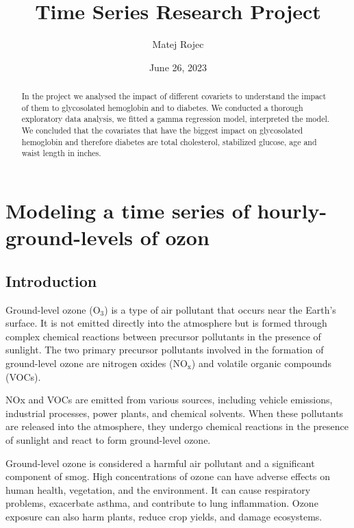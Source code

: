 \documentclass{article}
\title{Time Series Research Project}
\author{Matej Rojec}
\date{June 26, 2023}
\begin{document}
\maketitle
\newpage

\tableofcontents
\listoffigures
\listoftables

\newpage

\begin{abstract}
    In the project we analysed the impact of different covariets to understand the impact of them to glycosolated hemoglobin and to diabetes. We conducted a thorough exploratory data analysis, we fitted a gamma regression model, interpreted the model. We concluded that the covariates that have the biggest impact on glycosolated hemoglobin and therefore diabetes are total cholesterol, stabilized glucose, age and waist length in inches.
\end{abstract}

\section{Modeling a time series of hourly-ground-levels of ozon}

\subsection{Introduction}

Ground-level ozone ($\text{O}_3$) is a type of air pollutant that occurs near the Earth's surface. It is not emitted directly into the atmosphere but is formed through complex chemical reactions between precursor pollutants in the presence of sunlight. The two primary precursor pollutants involved in the formation of ground-level ozone are nitrogen oxides ($\text{NO}_\text{x}$) and volatile organic compounds (VOCs).

NOx and VOCs are emitted from various sources, including vehicle emissions, industrial processes, power plants, and chemical solvents. When these pollutants are released into the atmosphere, they undergo chemical reactions in the presence of sunlight and react to form ground-level ozone.

Ground-level ozone is considered a harmful air pollutant and a significant component of smog. High concentrations of ozone can have adverse effects on human health, vegetation, and the environment. It can cause respiratory problems, exacerbate asthma, and contribute to lung inflammation. Ozone exposure can also harm plants, reduce crop yields, and damage ecosystems.
\end{document}

